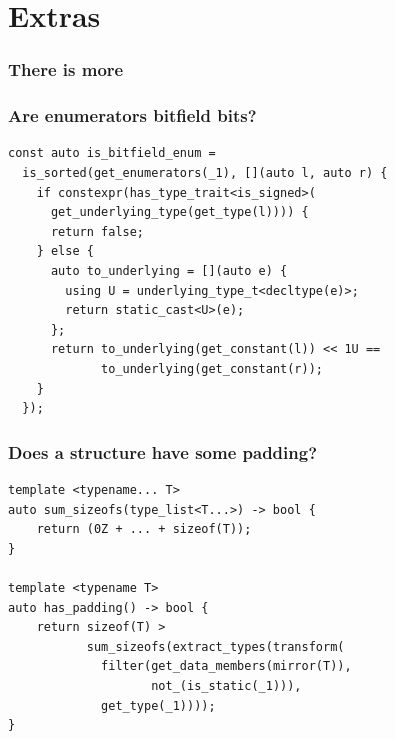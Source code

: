 \documentclass[compress,table,xcolor=table]{beamer}
\begin{document}
\section{Extras}
\begin{frame}
  \frametitle{There is more}
\end{frame}
\begin{frame}[fragile]
  \frametitle{Are enumerators bitfield bits?}
  \begin{lstlisting}[language=c++2x,basicstyle=\footnotesize\ttfamily]
const auto is_bitfield_enum =
  is_sorted(get_enumerators(_1), [](auto l, auto r) {
    if constexpr(has_type_trait<is_signed>(
      get_underlying_type(get_type(l)))) {
      return false;
    } else {
      auto to_underlying = [](auto e) {
        using U = underlying_type_t<decltype(e)>;
        return static_cast<U>(e);
      };
      return to_underlying(get_constant(l)) << 1U ==
             to_underlying(get_constant(r));
    }
  });
  \end{lstlisting}
\end{frame}
\begin{frame}[fragile]
  \frametitle{Does a structure have some padding?}
  \begin{lstlisting}[language=c++2x,basicstyle=\footnotesize\ttfamily]
template <typename... T>
auto sum_sizeofs(type_list<T...>) -> bool {
    return (0Z + ... + sizeof(T));
}

template <typename T>
auto has_padding() -> bool {
    return sizeof(T) >
           sum_sizeofs(extract_types(transform(
             filter(get_data_members(mirror(T)),
                    not_(is_static(_1))),
             get_type(_1))));
}
  \end{lstlisting}
\end{frame}
\end{document}
